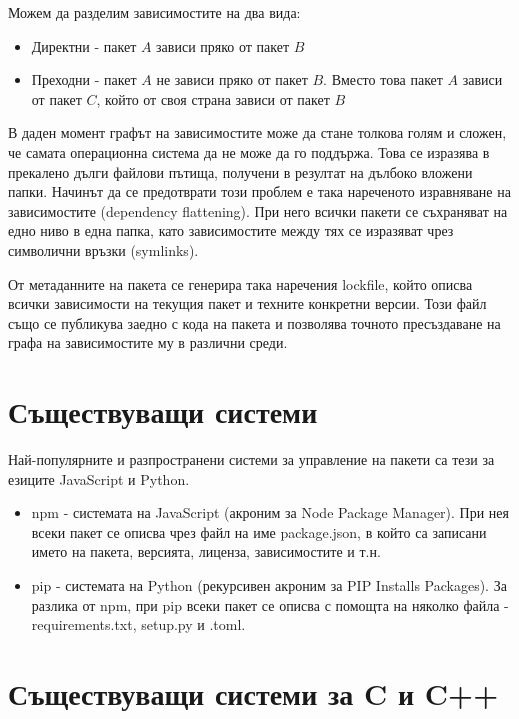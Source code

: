 Можем да разделим зависимостите на два вида:

\begin{itemize}
    \item Директни - пакет \(A\) зависи пряко от пакет \(B\)
    \item Преходни - пакет \(A\) не зависи пряко от пакет \(B\). Вместо това
          пакет \(A\) зависи от пакет \(C\), който от своя страна зависи от
          пакет \(B\)
\end{itemize}

В даден момент графът на зависимостите може да стане толкова голям и сложен, че
самата операционна система да не може да го поддържа. Това се изразява в
прекалено дълги файлови пътища, получени в резултат на дълбоко вложени папки.
Начинът да се предотврати този проблем е така нареченото изравняване на
зависимостите (dependency flattening). При него всички пакети се съхраняват на
едно ниво в една папка, като зависимостите между тях се изразяват чрез
символични връзки (symlinks).

От метаданните на пакета се генерира така наречения lockfile, който описва
всички зависимости на текущия пакет и техните конкретни версии. Този файл също
се публикува заедно с кода на пакета и позволява точното пресъздаване на графа
на зависимостите му в различни среди.


\section{Съществуващи системи}

Най-популярните и разпространени системи за управление на пакети са тези за
езиците JavaScript и Python.

\begin{itemize}
    \item npm - системата на JavaScript (акроним за Node Package Manager). При
          нея всеки пакет се описва чрез файл на име package.json, в който са
          записани името на пакета, версията, лиценза, зависимостите и т.н.
    \item pip - системата на Python (рекурсивен акроним за PIP Installs
          Packages). За разлика от npm, при pip всеки пакет се описва с помощта
          на няколко файла - requirements.txt, setup.py и .toml.
\end{itemize}


\section{Съществуващи системи за C и C++}

